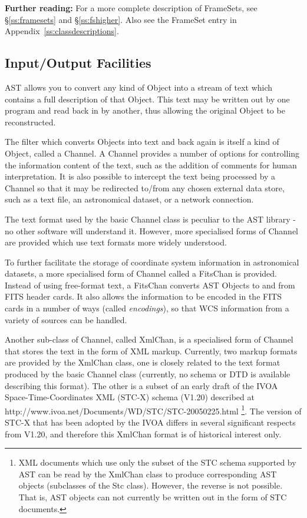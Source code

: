 \documentclass[twoside,11pt]{article}
\newcommand{\htmladdnormallink}[2]{#1}
\newcommand{\appref}[1]{Appendix~\ref{#1}}
\newcommand{\secref}[1]{\S\ref{#1}}
\newcommand{\appref}[1]{\ref{#1}}
\newcommand{\secref}[1]{\ref{#1}}
\begin{document}
{\bf{Further reading:}} For a more complete description of
FrameSets, see \secref{ss:framesets} and \secref{ss:fshigher}. Also
see the FrameSet entry in \appref{ss:classdescriptions}.

\subsection{Input/Output Facilities}

AST allows you to convert any kind of Object into a stream of text
which contains a full description of that Object. This text may be
written out by one program and read back in by another, thus allowing
the original Object to be reconstructed.

The filter which converts Objects into text and back again is itself a
kind of Object, called a Channel. A Channel provides a number of
options for controlling the information content of the text, such as
the addition of comments for human interpretation.  It is also
possible to intercept the text being processed by a Channel so that it
may be redirected to/from any chosen external data store, such as a
text file, an astronomical dataset, or a network connection.

The text format used by the basic Channel class is peculiar to the AST
library - no other software will understand it. However, more specialised
forms of Channel are provided which use text formats more widely
understood.

To further facilitate the storage of coordinate system information in
astronomical datasets, a more specialised form of Channel called a
FitsChan is provided. Instead of using free-format text, a FitsChan
converts AST Objects to and from FITS header cards. It also allows the
information to be encoded in the FITS cards in a number of ways
(called {\em{encodings}}), so that WCS information from a variety of
sources can be handled.

Another sub-class of Channel, called XmlChan, is a specialised form of
Channel that stores the text in the form of XML markup. Currently, two
markup formats are provided by the XmlChan class, one is closely related
to the text format produced by the basic Channel class (currently, no
schema or DTD is available describing this format). The other is a subset
of an early draft of the IVOA Space-Time-Coordinates XML (STC-X) schema
(V1.20) described at \htmladdnormallink{
http://www.ivoa.net/Documents/WD/STC/STC-20050225.html
}{
http://www.ivoa.net/Documents/WD/STC/STC-20050225.html
}\footnote{XML documents which use only the subset of the STC schema
supported by AST can be read by the XmlChan class to produce
corresponding AST objects (subclasses of the Stc class). However, the
reverse is not possible. That is, AST objects can not currently be
written out in the form of STC documents.}. The version of STC-X that has
been adopted by the IVOA differs in several significant respects from
V1.20, and therefore this XmlChan format is of historical interest only.
\end{document}
